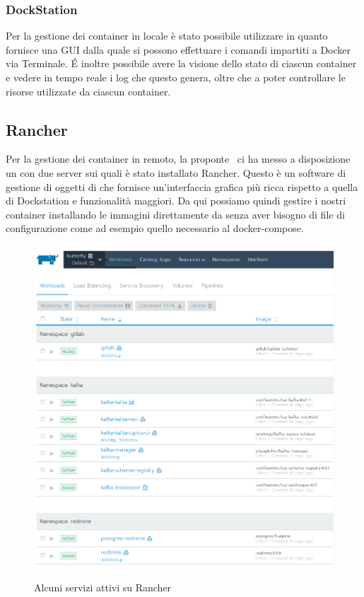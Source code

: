         \subsubsection{DockStation}
        Per la gestione dei container in locale è stato possibile utilizzare  in quanto fornisce una GUI dalla quale si possono effettuare i comandi impartiti a Docker via Terminale.
        \'E inoltre possibile avere la visione dello stato di ciascun container e vedere in tempo reale i log che questo genera, oltre che a poter controllare le risorse utilizzate da ciascun container.
        
        \subsection{Rancher}
    	Per la gestione dei container in remoto, la proponte \II~ci ha messo a disposizione un  con due server sui quali è stato installato Rancher. Questo è un software di gestione di oggetti di  che fornisce un'interfaccia grafica più ricca rispetto a quella di Dockstation e funzionalità maggiori.
    	Da qui possiamo quindi gestire i nostri container installando le immagini direttamente da  senza aver bisogno di file di configurazione come ad esempio quello necessario al docker-compose.
    	
    	\begin{figure}[H]\label{ImgRancher}
    		\centering
    		\includegraphics[width=.7\textwidth]{img/rancher.png}\\
    		\caption{Alcuni servizi attivi su Rancher}
    		\label{fig:rancher}
    	\end{figure}
        
			